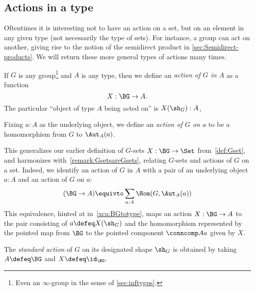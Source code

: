 \subsection{Actions in a type}
\label{sec:actions}
Oftentimes it is interesting not to have an action on a set, 
but on an element in any given type (not necessarily the type of sets).  
For instance, a group can act on another, giving rise to the notion of 
the semidirect product in \cref{sec:Semidirect-products}.  
We will return these more general types of actions many times.

\begin{definition}\label{def:action}
  If $G$ is any group\footnote{%
  Even an $\infty$-group in the sense of \cref{sec:inftygps}.}
  and $A$ is any type,
  then we define an \emph{action of $G$ in $A$} as a function
  \[
    X : \BG \to A.
  \]
  The particular ``object of type $A$ being acted on'' is $X(\sh_G):A$,

  Fixing $a:A$ as the underlying object, 
  we define an \emph{action of $G$ on $a$}
  to be a homomorphism from $G$ to $\Aut_A(a)$.%
\end{definition}
This generalizes our earlier definition of $G$-sets $X : \BG \to \Set$
from~\cref{def:Gset},
and harmonizes with~\cref{remark:GsetsareGsets}, relating $G$-sets and
actions of $G$ on a set.
Indeed, we identify
an action of $G$ in $A$ with a pair of an underlying object
$a:A$ and an action of $G$ on $a$:
\[
  (\BG \to A) \equivto \sum_{a:A}\Hom(G,\Aut_A(a))
\]
This equivalence,
hinted at in~\cref{xca:BGtotype},
maps an action $X:\BG\to A$
to the pair consisting of $a \defeq X(\sh_G)$
and the homomorphism represented by the pointed map
from $\BG$ to the pointed component $\conncomp A a$ given by $X$.

\begin{definition}\label{std-action}
  The \emph{standard action} of $G$ on its designated shape $\sh_G$ is obtained by
  taking $A \defeq \BG$ and $X \defeq \id_{\BG}$.
\end{definition}

